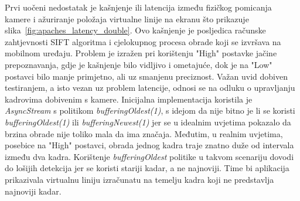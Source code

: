 Prvi uočeni nedostatak je kašnjenje ili latencija između fizičkog pomicanja kamere i ažuriranje položaja virtualne linije na ekranu što prikazuje slika~\ref{fig:apaches_latency_double}. Ovo kašnjenje je posljedica računske zahtjevnosti SIFT algoritma i cjelokupnog procesa obrade koji se izvršava na mobilnom uređaju. Problem je izražen pri korištenju "High" postavke jačine prepoznavanja, gdje je kašnjenje bilo vidljivo i ometajuće, dok je na "Low" postavci bilo manje primjetno, ali uz smanjenu preciznost. 
Važan uvid dobiven testiranjem, a isto vezan uz problem latencije, odnosi se na odluku o upravljanju kadrovima dobivenim s kamere. Inicijalna implementacija koristila je \textit{AsyncStream} s politikom \textit{bufferingOldest(1)}, s idejom da nije bitno je li se koristi \textit{bufferingOldest(1)} ili \textit{bufferingNewest(1)} jer se u idealnim uvjetima pokazalo da brzina obrade nije toliko mala da ima značaja. Međutim, u realnim uvjetima, posebice na "High" postavci, obrada jednog kadra traje znatno duže od intervala između dva kadra. Korištenje \textit{bufferingOldest} politike u takvom scenariju dovodi do lošijih detekcija jer se koristi stariji kadar, a ne najnoviji. Time bi aplikacija prikazivala virtualnu liniju izračunatu na temelju kadra koji ne predstavlja najnoviji kadar.

